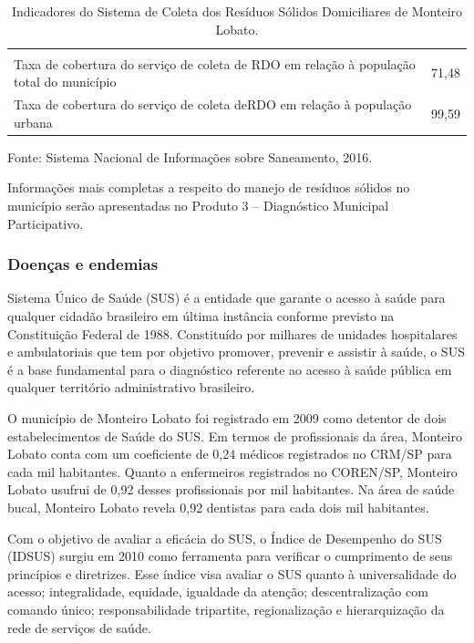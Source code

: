 \begin{table}[htbp]
	\centering
	\caption{Indicadores do Sistema de Coleta dos Resíduos Sólidos Domiciliares de Monteiro Lobato.}
	\begin{tabular}{p{31.715em}|c}
		\rowcolor[rgb]{ .969,  .588,  .275} \multicolumn{2}{p{38.785em}}{\textcolor[rgb]{ 1,  1,  1}{\textbf{Indicadores do Sistema de Coleta dos Resíduos Sólidos Domiciliares (RDO) (\%)}}} \\
		\rowcolor[rgb]{ .984,  .831,  .706} Taxa de cobertura do serviço de coleta de RDO em relação à população total do município & 71,48 \\
		\rowcolor[rgb]{ .992,  .914,  .851} Taxa de cobertura do serviço de coleta deRDO em relação à população urbana & 99,59 \\
	\end{tabular}%
	\label{tab:indicadores_rs}%
\end{table}%
Fonte: Sistema Nacional de Informações sobre Saneamento, 2016.


Informações mais completas a respeito do manejo de resíduos sólidos no município serão apresentadas no Produto 3 – Diagnóstico Municipal Participativo. 

\subsubsection{Doenças e endemias}

Sistema Único de Saúde (SUS) é a entidade que garante o acesso à saúde para qualquer cidadão brasileiro em última instância conforme previsto na Constituição Federal de 1988. Constituído por milhares de unidades hospitalares e ambulatoriais que tem por objetivo promover, prevenir e assistir à saúde, o SUS é a base fundamental para o diagnóstico referente ao acesso à saúde pública em qualquer território administrativo brasileiro. 

O município de Monteiro Lobato foi registrado em 2009 como detentor de dois estabelecimentos de Saúde do SUS. Em termos de profissionais da área, Monteiro Lobato conta com um coeficiente de 0,24 médicos registrados no CRM/SP para cada mil habitantes. Quanto a enfermeiros registrados no COREN/SP, Monteiro Lobato usufrui de 0,92 desses profissionais por mil habitantes. Na área de saúde bucal, Monteiro Lobato revela 0,92 dentistas para cada dois mil habitantes.

Com o objetivo de avaliar a eficácia do SUS, o Índice de Desempenho do SUS (IDSUS) surgiu em 2010 como ferramenta para verificar o cumprimento de seus princípios e diretrizes. Esse índice visa avaliar o SUS quanto à universalidade do acesso; integralidade, equidade, igualdade da atenção; descentralização com comando único; responsabilidade tripartite, regionalização e hierarquização da rede de serviços de saúde.

